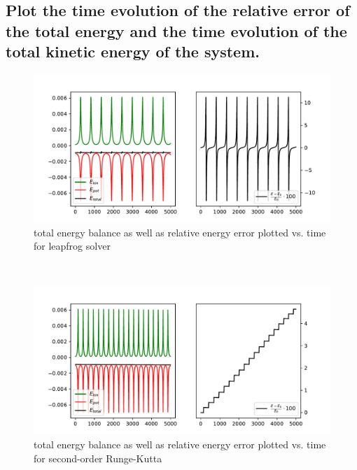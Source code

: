     \subsection{Plot the time evolution of the relative error 
        of the total energy and the time evolution of the total kinetic
        energy of the system.}
    \begin{figure}[h!]
        \centering
        \includegraphics[width=\textwidth]{./figures/task1_1_energies_lf_test.pdf}
        \caption{total energy balance as well as relative energy error plotted 
            vs. time for leapfrog solver}
    \end{figure} \ \\ 
    \begin{figure}[h!]
        \centering
        \includegraphics[width=\textwidth]{./figures/task1_1_energies_rk2.pdf}
        \caption{total energy balance as well as relative energy error plotted 
            vs. time for second-order Runge-Kutta}
    \end{figure} \ \\ 
